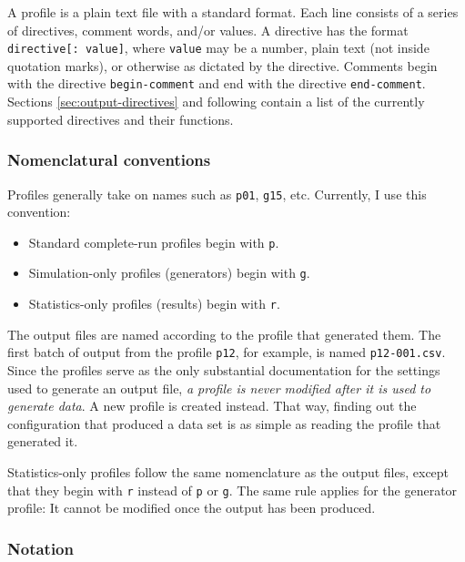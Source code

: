 \documentclass{article}
\begin{document}
      A profile is a plain text file with a standard format. Each line consists
      of a series of directives, comment words, and/or values. A directive has
      the format \verb|directive[: value]|, where \verb|value| may be a number,
      plain text (not inside quotation marks), or otherwise as dictated by the
      directive. Comments begin with the directive \verb|begin-comment| and end
      with the directive \verb|end-comment|. Sections
      \ref{sec:output-directives} and following contain a list of the currently
      supported directives and their functions.

      \subsubsection{Nomenclatural conventions}
	\label{sec:profile-nomenclature}

	Profiles generally take on names such as \verb|p01|, \verb|g15|, etc.
	Currently, I use this convention:

	\begin{itemize}
	  \item Standard complete-run profiles begin with \verb|p|.
	  \item Simulation-only profiles (generators) begin with \verb|g|.
	  \item Statistics-only profiles (results) begin with \verb|r|.
	\end{itemize}

	The output files are named according to the profile that generated them.
	The first batch of output from the profile \verb|p12|, for example, is
	named \verb|p12-001.csv|. Since the profiles serve as the only
	substantial documentation for the settings used to generate an output
	file, {\em a profile is never modified after it is used to generate
	data}. A new profile is created instead. That way, finding out the
	configuration that produced a data set is as simple as reading the
	profile that generated it.

	Statistics-only profiles follow the same nomenclature as the output
	files, except that they begin with \verb|r| instead of \verb|p| or
	\verb|g|. The same rule applies for the generator profile: It cannot be
	modified once the output has been produced.

      \subsubsection{Notation}
        \label{sec:notation}
\end{document}
